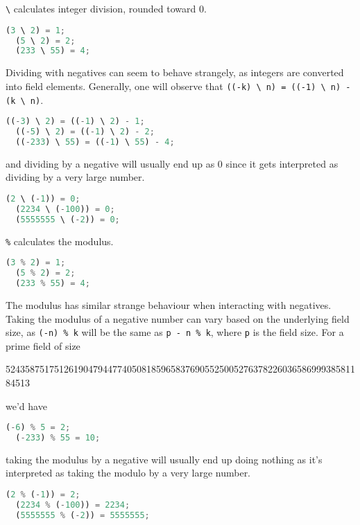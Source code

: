 \lstinline|\| calculates integer division, rounded toward 0.

\begin{lstlisting}[language=Python]
  (3 \ 2) = 1;
  (5 \ 2) = 2;
  (233 \ 55) = 4;
\end{lstlisting}

Dividing with negatives can seem to behave strangely, as integers are converted into field elements. Generally, one will observe that \lstinline|((-k) \ n) = ((-1) \ n) - (k \ n)|.

\begin{lstlisting}[language=Python]
  ((-3) \ 2) = ((-1) \ 2) - 1;
  ((-5) \ 2) = ((-1) \ 2) - 2;
  ((-233) \ 55) = ((-1) \ 55) - 4;
\end{lstlisting}

and dividing by a negative will usually end up as 0 since it gets interpreted as dividing by a very large number.

\begin{lstlisting}[language=Python]
  (2 \ (-1)) = 0;
  (2234 \ (-100)) = 0;
  (5555555 \ (-2)) = 0;
\end{lstlisting}

\lstinline|%| calculates the modulus.

\begin{lstlisting}[language=Python]
  (3 % 2) = 1;
  (5 % 2) = 2;
  (233 % 55) = 4;
\end{lstlisting}

The modulus has similar strange behaviour when interacting with negatives. Taking the modulus of a negative number can vary based on the underlying field size, as \lstinline|(-n) % k| will be the same as  \lstinline|p - n % k|, where \lstinline|p| is the field size. For a prime field of size

52435875175126190479447740508185965837690552500527637822603658699938581184513

we'd have

\begin{lstlisting}[language=Python]
  (-6) % 5 = 2;
  (-233) % 55 = 10;
\end{lstlisting}

taking the modulus by a negative will usually end up doing nothing as it's interpreted as taking the modulo by a very large number.

\begin{lstlisting}[language=Python]
  (2 % (-1)) = 2;
  (2234 % (-100)) = 2234;
  (5555555 % (-2)) = 5555555;
\end{lstlisting}


